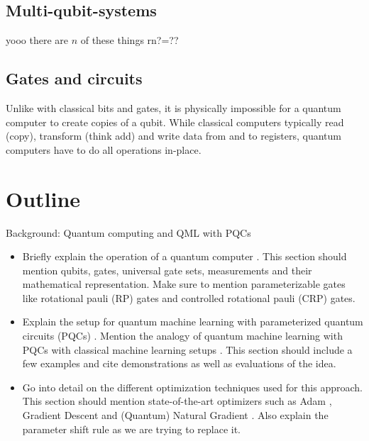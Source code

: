 \subsection{Multi-qubit-systems}
yooo there are $n$ of these things rn?=??

\subsection{Gates and circuits}

Unlike with classical bits and gates, it is physically impossible for a quantum
computer to create copies of a qubit.
While classical computers typically read (copy), transform (think add) and write
data from and to registers, quantum computers have to do all operations
in-place.

\section{Outline}
Background: Quantum computing and QML with PQCs
\begin{itemize}
    \item
        Briefly explain the operation of a quantum computer
        \cite{nielsen_quantum_2007}.
        This section should mention qubits, gates, universal gate sets,
        measurements and their mathematical representation.
        Make sure to mention parameterizable gates like rotational pauli (RP)
        gates and controlled rotational pauli (CRP) gates.
    \item
        Explain the setup for quantum machine learning with parameterized
        quantum circuits (PQCs) \cite{mitarai_quantum_2018}.
        Mention the analogy of quantum machine learning with PQCs with
        classical machine learning setups \cite{bishop_pattern_2006}.
        This section should include a few examples and cite demonstrations
        as well as evaluations of the idea.
    \item
        Go into detail on the different optimization techniques used for
        this approach.
        This section should mention state-of-the-art optimizers such as
        Adam \cite{kingma_adam_2017}, Gradient Descent and
        (Quantum) Natural Gradient \cite{stokes_quantum_2020}.
        Also explain the parameter shift rule
        \cite{mitarai_quantum_2018,schuld_evaluating_2019} as we are trying
        to replace it.
\end{itemize}

